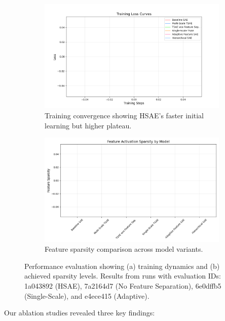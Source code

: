 \documentclass{article} %
\begin{document}
\begin{figure}[h]
    \centering
    \begin{subfigure}{0.48\textwidth}
        \includegraphics[width=\textwidth]{training_curves.png}
        \caption{Training convergence showing HSAE's faster initial learning but higher plateau.}
        \label{fig:training}
    \end{subfigure}
    \hfill
    \begin{subfigure}{0.48\textwidth}
        \includegraphics[width=\textwidth]{feature_sparsity.png}
        \caption{Feature sparsity comparison across model variants.}
        \label{fig:sparsity}
    \end{subfigure}
    \caption{Performance evaluation showing (a) training dynamics and (b) achieved sparsity levels. Results from runs with evaluation IDs: 1a043892 (HSAE), 7a2164d7 (No Feature Separation), 6e0dffb5 (Single-Scale), and e4ece415 (Adaptive).}
    \label{fig:results}
\end{figure}

Our ablation studies revealed three key findings:
\end{document}
